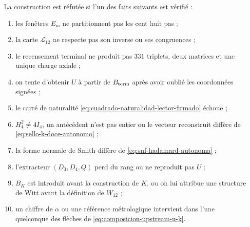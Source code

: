 \begin{criterion}
La construction est réfutée si l'un des faits
suivants est vérifié :
\begin{enumerate}
 \item les fenêtres \(E_m\) ne partitionnent pas les cent huit pas ;
 \item la carte \(\mathcal L_{12}\) ne respecte pas son inverse ou ses congruences ;
 \item le recensement terminal ne produit pas \(331\) triplets, deux matrices et une unique
       charge axiale ;
 \item on tente d’obtenir \(U\) à partir de \(B_{\rm term}\) après avoir oublié les
       coordonnées signées ;
 \item le carré de naturalité
       \eqref{eq:cuadrado-naturalidad-lector-firmado} échoue ;
 \item \(H_4^2\neq4I_4\), un antécédent n’est pas entier ou le vecteur
       reconstruit diffère de \eqref{eq:sello-k-doce-autonomo} ;
 \item la forme normale de Smith diffère de
       \eqref{eq:snf-hadamard-autonoma} ;
 \item l'extracteur \((D_3,D_4,Q)\) perd du rang ou ne reproduit pas \(U\) ;
 \item \(B_K\) est introduit avant la construction de \(K\), ou on lui attribue une
       structure de Witt avant la définition de \(W_{12}\) ;
 \item un chiffre de \(\alpha\) ou une référence métrologique intervient dans
       l’une quelconque des flèches de \eqref{eq:composicion-upstream-u-k}.
\end{enumerate}
\end{criterion}
